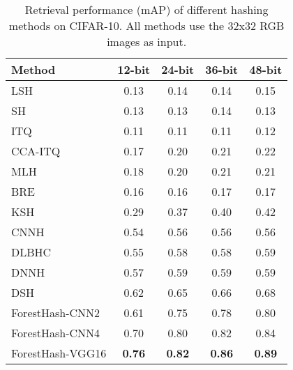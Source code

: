 \documentclass[runningheads]{llncs}
\begin{document}
\begin{table}
  \begin{center}
    \scriptsize
    \setlength{\tabcolsep}{4pt}
    \begin{tabular}{l|cccc}
      \hline
      Method             & 12-bit    & 24-bit      & 36-bit    & 48-bit     \\
      \hline %
      \hline %
      LSH \cite{LSH}     & 0.13      & 0.14        & 0.14      & 0.15       \\
      SH \cite{SH}       & 0.13      & 0.13        & 0.14      & 0.13       \\
      ITQ \cite{ITQ}     & 0.11      & 0.11        & 0.11      & 0.12       \\
      CCA-ITQ \cite{ITQ} & 0.17      & 0.20        & 0.21      & 0.22       \\
      MLH \cite{MLH}     & 0.18      & 0.20        & 0.21      & 0.21       \\
      BRE \cite{BRE}     & 0.16      & 0.16        & 0.17      & 0.17       \\
      KSH \cite{KSH}     & 0.29      & 0.37        & 0.40      & 0.42       \\
      CNNH \cite{CNNH}   & 0.54      & 0.56        & 0.56      & 0.56       \\
      DLBHC \cite{DLBHC} & 0.55      & 0.58        & 0.58      & 0.59       \\
      DNNH \cite{DNNH}   & 0.57      & 0.59        & 0.59      & 0.59       \\
      DSH \cite{DSH}     & 0.62      & 0.65        & 0.66      & 0.68       \\
      \hline %
      ForestHash-CNN2    & 0.61      & 0.75        & 0.78      & 0.80       \\
      ForestHash-CNN4    & 0.70      & 0.80        & 0.82      & 0.84       \\
      ForestHash-VGG16   & \bf{0.76} & \bf{0.82}   & \bf{0.86} & \bf{0.89}  \\
      \hline
    \end{tabular}
  \end{center}
  \caption{Retrieval performance (mAP) of different hashing methods on
    CIFAR-10. All methods use the 32x32 RGB images as input. }
  \label{tab:CIFAR-hash-50k}
  \vspace{-1em}
\end{table}
\end{document}
